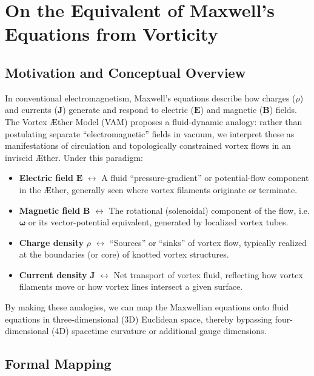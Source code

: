 \documentclass[aps,preprint,superscriptaddress]{revtex4-2}
\begin{document}
    \section{On the Equivalent of Maxwell’s Equations from Vorticity}

    \subsection{Motivation and Conceptual Overview}

    In conventional electromagnetism, Maxwell’s equations describe how charges (\( \rho \)) and currents (\(\mathbf{J}\)) generate and respond to electric (\(\mathbf{E}\)) and magnetic (\(\mathbf{B}\)) fields. The Vortex Æther Model (VAM) proposes a fluid-dynamic analogy: rather than postulating separate “electromagnetic” fields in vacuum, we interpret these as manifestations of circulation and topologically constrained vortex flows in an inviscid Æther. Under this paradigm:

    \begin{itemize}
        \item \textbf{Electric field} \(\mathbf{E}\) \(\longleftrightarrow\) A fluid “pressure-gradient” or potential-flow component in the Æther, generally seen where vortex filaments originate or terminate.
        \item \textbf{Magnetic field} \(\mathbf{B}\) \(\longleftrightarrow\) The rotational (solenoidal) component of the flow, i.e. \(\boldsymbol{\omega}\) or its vector-potential equivalent, generated by localized vortex tubes.
        \item \textbf{Charge density} \(\rho\) \(\longleftrightarrow\) “Sources” or “sinks” of vortex flow, typically realized at the boundaries (or core) of knotted vortex structures.
        \item \textbf{Current density} \(\mathbf{J}\) \(\longleftrightarrow\) Net transport of vortex fluid, reflecting how vortex filaments move or how vortex lines intersect a given surface.
    \end{itemize}

    By making these analogies, we can map the Maxwellian equations onto fluid equations in three-dimensional (3D) Euclidean space, thereby bypassing four-dimensional (4D) spacetime curvature or additional gauge dimensions.

    \subsection{Formal Mapping}
\end{document}
